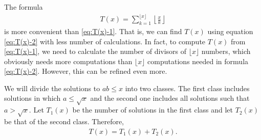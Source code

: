 \documentclass[12pt]{subfile}
\begin{document}
The formula
	\begin{align}
		T(x) = \sum_{k=1}^{\lfloor x \rfloor} \left\lfloor \frac{x}{k} \right\rfloor \label{eq:T(x)-2}
	\end{align}
is more convenient than \eqref{eq:T(x)-1}. That is, we can find $T(x)$ using equation \eqref{eq:T(x)-2} with less number of calculations. In fact, to compute $T(x)$ from \eqref{eq:T(x)-1}, we need to calculate the number of divisors of $\lfloor x \rfloor$ numbers, which obviously needs more computations than $\lfloor x \rfloor$  computations needed in formula \eqref{eq:T(x)-2}. However, this can be refined even more.

We will divide the solutions to $ab \leq x$ into two classes. The first class includes solutions in which $a \leq \sqrt x$ and the second one includes all solutions such that $a > \sqrt x$. Let $T_1(x)$ be the number of solutions in the first class and let $T_2(x)$ be that of the second class. Therefore,
	\begin{align*}
		T(x) = T_1(x) + T_2(x).
	\end{align*}
\end{document}
